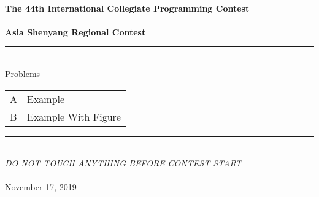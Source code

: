 \begin{titlepage}
\selectfont
\begin{center}
\Large{\textbf{
~\\%
The 44th International Collegiate Programming Contest\\%
~\\%
Asia Shenyang Regional Contest}}
\vfill
\begin{spacing}{1.2}
\rule{100mm}{1pt}\\
Problems
\begin{center}
\begin{tabular}{c|l}
    A & Example  \\ 
    B & Example With Figure 
\end{tabular}
\end{center}
\rule{100mm}{1pt}
\end{spacing}
\vfill
\Large{
~\\%
\textit{DO NOT TOUCH ANYTHING BEFORE CONTEST START}}\\%
~\\%
November 17, 2019
\end{center}
\end{titlepage}